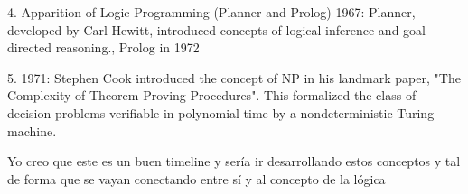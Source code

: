 \documentclass{article}
\begin{document}
4. Apparition of Logic Programming (Planner and Prolog) 
1967: Planner, developed by Carl Hewitt, introduced concepts of logical inference and goal-directed reasoning., Prolog in 1972

5. 1971: Stephen Cook introduced the concept of NP in his landmark paper, "The Complexity of Theorem-Proving Procedures". This formalized the class of decision problems verifiable in polynomial time by a nondeterministic Turing machine.

Yo creo que este es un buen timeline y sería ir desarrollando estos conceptos y tal de forma que se vayan conectando entre sí y al concepto de la lógica




\renewcommand{\refname}{Referencias}


\end{document}
